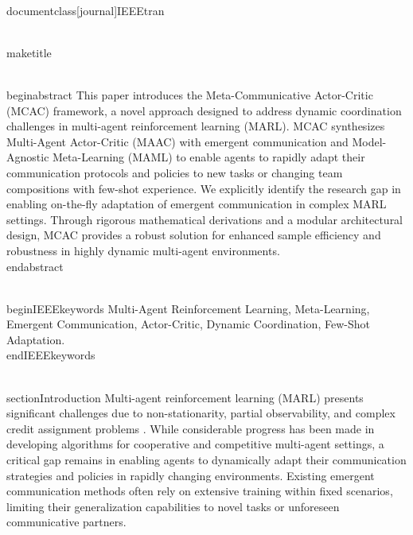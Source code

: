 \\documentclass[journal]{IEEEtran}
\begin{document}
\\maketitle

\\begin{abstract}
This paper introduces the Meta-Communicative Actor-Critic (MCAC) framework, a novel approach designed to address dynamic coordination challenges in multi-agent reinforcement learning (MARL). MCAC synthesizes Multi-Agent Actor-Critic (MAAC) with emergent communication and Model-Agnostic Meta-Learning (MAML) to enable agents to rapidly adapt their communication protocols and policies to new tasks or changing team compositions with few-shot experience. We explicitly identify the research gap in enabling on-the-fly adaptation of emergent communication in complex MARL settings. Through rigorous mathematical derivations and a modular architectural design, MCAC provides a robust solution for enhanced sample efficiency and robustness in highly dynamic multi-agent environments.
\\end{abstract}

\\begin{IEEEkeywords}
Multi-Agent Reinforcement Learning, Meta-Learning, Emergent Communication, Actor-Critic, Dynamic Coordination, Few-Shot Adaptation.
\\end{IEEEkeywords}

\\section{Introduction}
Multi-agent reinforcement learning (MARL) presents significant challenges due to non-stationarity, partial observability, and complex credit assignment problems \cite{Lowe2017}. While considerable progress has been made in developing algorithms for cooperative and competitive multi-agent settings, a critical gap remains in enabling agents to dynamically adapt their communication strategies and policies in rapidly changing environments. Existing emergent communication methods often rely on extensive training within fixed scenarios, limiting their generalization capabilities to novel tasks or unforeseen communicative partners.
\end{document}
